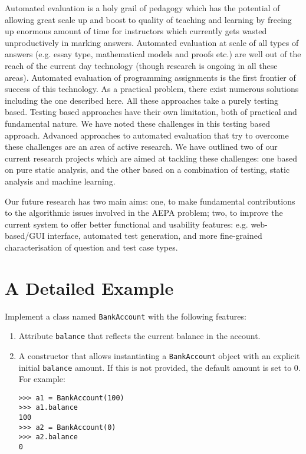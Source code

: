 \documentclass[12pt]{article}
\begin{document}
Automated evaluation is a holy grail of pedagogy which has the potential of allowing great scale up and boost to quality of teaching and learning by freeing up enormous amount of time for instructors which currently gets wasted unproductively in marking answers. Automated evaluation at scale of all types of answers (e.g. essay type, mathematical models and proofs etc.) are well out of the reach of the current day technology (though research is ongoing in all these areas). Automated evaluation of programming assignments is the first frontier of success of this technology. As a practical problem, there exist numerous solutions including the one described here. All these approaches take a purely testing based. Testing based approaches have their own limitation, both of practical and fundamental nature. We have noted these challenges in this testing based approach. Advanced approaches to automated evaluation that try to overcome these challenges are an area of active research. We have outlined two of our current research projects which are aimed at tackling these challenges: one based on pure static analysis, and the other based on a combination of testing, static analysis and machine learning.

Our future research has two main aims: one, to make fundamental contributions to the algorithmic issues involved in the AEPA problem; two, to improve the current system to offer better functional and usability features: e.g. web-based/GUI interface, automated test generation, and more fine-grained characterisation of question and test case types. 




\section{A Detailed Example}

\begin{mdframed}[frametitle=Example]
Implement a class named \lstinline[style=pc]|BankAccount| with the following features:
\begin{enumerate}
\item Attribute \lstinline[style=pc]|balance| that reflects the current balance in the account.
\item A constructor that allows instantiating a \lstinline[style=pc]|BankAccount| object with an explicit initial \lstinline[style=pc]|balance| amount. If this is not provided, the default amount is set to 0. For example:
\begin{lstlisting}[style=oc]
>>> a1 = BankAccount(100)
>>> a1.balance
100
>>> a2 = BankAccount(0)
>>> a2.balance
0
\end{lstlisting}
\end{enumerate}
\end{mdframed}
\end{document}
